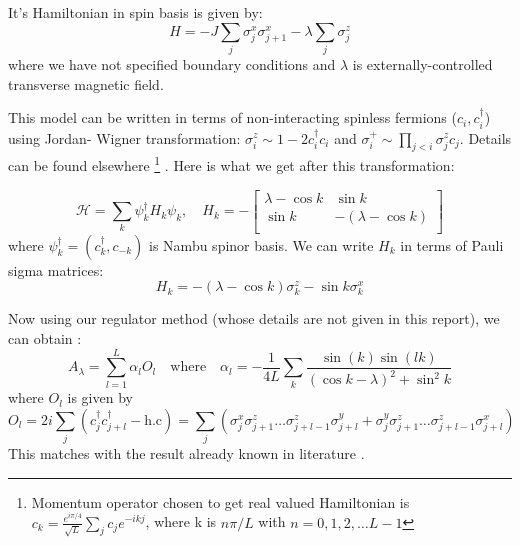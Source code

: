 \documentclass[11pt,a4paper]{article}
\begin{document}
It's Hamiltonian in spin basis is given by:
\begin{equation}
H= -J \sum_{j} \sigma_j^x \sigma_{j+1}^x - \lambda \sum_{j} \sigma_j^z 
\label{xx_z}
\end{equation}
where we have not specified boundary conditions and $\lambda$ is externally-controlled transverse magnetic field.

This model can be written in terms of non-interacting spinless fermions ($c_i, c^{\dagger}_i $) using Jordan- Wigner transformation: $\sigma_i^z \sim 1 - 2 c^{\dagger}_i c_i   $ and $\sigma_i^+ \sim \prod_{j<i} \sigma_j^z c_j   $. Details can be found elsewhere \cite{sachdev2007quantum} \footnote{Momentum operator chosen to get real valued Hamiltonian is $c_k= \frac{e^{i \pi/4}}{\sqrt{L}}\sum_j c_j e^{-ikj}$, where k is $n\pi/L$ with $n=0,1,2, \ldots L-1$} . Here is what we get after this transformation:

\begin{equation}
\mathcal{H}= \sum_k \psi_k^{\dagger} H_k \psi_k , \quad H_k=-\begin{bmatrix}
     \lambda - \cos k & \sin k \\
\sin k & -(\lambda - \cos k)\\
\end{bmatrix}
\end{equation}
where $\psi_k^{\dagger}= (c^{\dagger}_k, c_{-k})$ is Nambu spinor basis. We can write $H_k$ in terms of Pauli sigma matrices:
\begin{equation}
H_k= -(\lambda - \cos k) \sigma^z_k - \sin k  \sigma^x_k
\end{equation}



Now using our regulator method (whose details are not given in this report), we can obtain :
\begin{equation}
\boxed{A_{\lambda}= \sum_{l=1}^{L} \alpha_l O_l \quad \mbox{where} \quad \alpha_l= -\dfrac{1}{4 L} \sum_k \dfrac{\sin(k) \sin(lk)}{(\cos k - \lambda)^2 + \sin^2 k}}
\end{equation}
where  $O_l$ is given by
\begin{equation}
O_l= 2 i \sum_j (c^{\dagger}_{j} c^{\dagger}_{j+l} - \mbox{h.c})= \sum_j ( \sigma_j^x \sigma_{j+1}^z \ldots \sigma_{j+l-1}^z \sigma_{j+l}^y +  \sigma_j^y \sigma_{j+1}^z \ldots \sigma_{j+l-1}^z \sigma_{j+l}^x)
\end{equation}
This matches with the result already known in literature \cite{del2012assisted, kolodrubetz2016geometry}.
\end{document}

